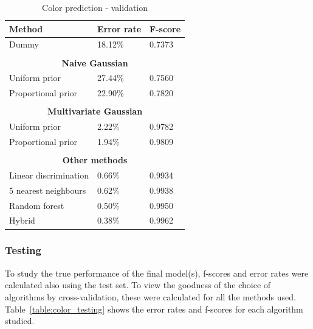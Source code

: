 \documentclass[twoside]{article}
\begin{document}
\begin{multicols}{2}
\begin{table}[H]
\caption{Color prediction - validation}
\label{table:color_validation}
\begin{tabular}{lll}
\textbf{Method} & \textbf{Error rate} & \textbf{F-score}\\
\midrule
Dummy & 18.12\% & 0.7373 \\
\\
\multicolumn{3}{c}{\textbf{Naive Gaussian}} \\
Uniform prior & 27.44\% & 0.7560 \\
Proportional prior & 22.90\% & 0.7820 \\
\\
\multicolumn{3}{c}{\textbf{Multivariate Gaussian}} \\
Uniform prior & 2.22\% & 0.9782 \\
Proportional prior & 1.94\% & 0.9809 \\
\\
\multicolumn{3}{c}{\textbf{Other methods}} \\
Linear discrimination & 0.66\% & 0.9934 \\
$5$ nearest neighbours & 0.62\% & 0.9938 \\
Random forest & 0.50\% & 0.9950 \\
Hybrid & 0.38\% & 0.9962 \\

\end{tabular}
\end{table}

\subsubsection{Testing}

To study the true performance of the final model(s), f-scores and error rates were calculated also using the test set. To view
the goodness of the choice of algorithms by cross-validation, these were calculated for all the methods used. 
Table~\ref{table:color_testing} shows the error rates and f-scores for each algorithm studied.


\end{multicols}
\end{document}
